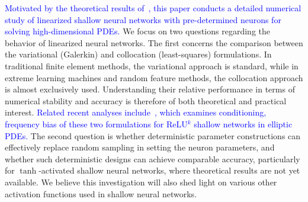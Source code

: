 \documentclass{article}
\theoremstyle{remark}
\begin{document}
\textcolor{blue}{Motivated by the theoretical results of~\cite{LMX2025, MX:2025lower}, this paper conducts a detailed numerical study of linearized shallow neural networks with pre-determined neurons for solving high-dimensional PDEs.}
We focus on two questions regarding the behavior of linearized neural networks.
The first concerns the comparison between the variational (Galerkin) and collocation (least-squares) formulations.
In traditional finite element methods, the variational approach is standard, while in extreme learning machines and random feature methods, the collocation approach is almost exclusively used.
Understanding their relative performance in terms of numerical stability and accuracy is therefore of both theoretical and practical interest. 
\textcolor{blue}{Related recent analyses include~\cite{HLZZ:2025}, which examines conditioning, frequency bias of these two formulations for ReLU$^k$ shallow networks in elliptic PDEs.}
The second question is whether deterministic parameter constructions can effectively replace random sampling in setting the neuron parameters, and whether such deterministic designs can achieve comparable accuracy, particularly for $\tanh$-activated shallow neural networks, where theoretical results are not yet available.
We believe this investigation will also shed light on various other activation functions used in shallow neural networks. 
\end{document}
